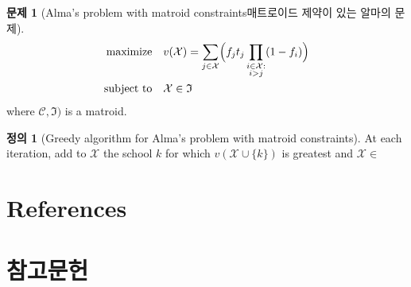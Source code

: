 \documentclass[11pt]{article} %
\newtheorem{theorem}{Theorem}
\theoremstyle{definition}
\newtheorem{definition}{Definition}
\newtheorem{problem}{Problem}
\newtheorem{theorem}{정리}
\theoremstyle{definition}
\newtheorem{definition}{정의}
\newtheorem{problem}{문제}
\begin{document}
\begin{problem}[\ifen Alma’s problem with matroid constraints\else 매트로이드 제약이 있는 알마의 문제\fi]
\begin{align}
\begin{split}
\text{maximize}\quad &  v(\mathcal{X}) = \sum_{j\in
\mathcal{X}} \Bigl( f_j t_j \prod_{\substack{i \in \mathcal{X}: \\ i > j}} (1 - f_{i}) \Bigr)\\
\text{subject to}\quad & \mathcal{X} \in \mathfrak{I}
\end{split}
\end{align}
where $\mathcal{C}, \mathfrak{I})$ is a matroid.
\end{problem}



\begin{definition}[Greedy algorithm for Alma's problem with matroid constraints]
At each iteration, add to $\mathcal{X}$ the school $k$ for which $v(\mathcal{X} \cup \{k\})$ is greatest and $\mathcal{X} \in $
\end{definition}

%
\else



















\pagebreak
\ifen
\section*{References}
\else
\section*{참고문헌}
\fi
\noindent


\end{document}
